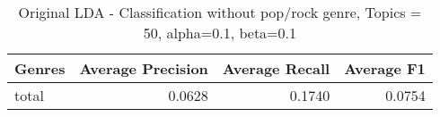 \begin{table}[h!]
\begin{tabular}{|l|r|r|r|}

\hline
\textbf{Genres} &  \textbf{Average Precision} & \textbf{Average Recall} & \textbf{Average F1} \\
\hline
total& 0.0628& 	0.1740& 	0.0754\\
\hline
\end{tabular}
\caption{Original LDA - Classification without pop/rock genre, Topics = 50, alpha=0.1, beta=0.1}
\end{table}